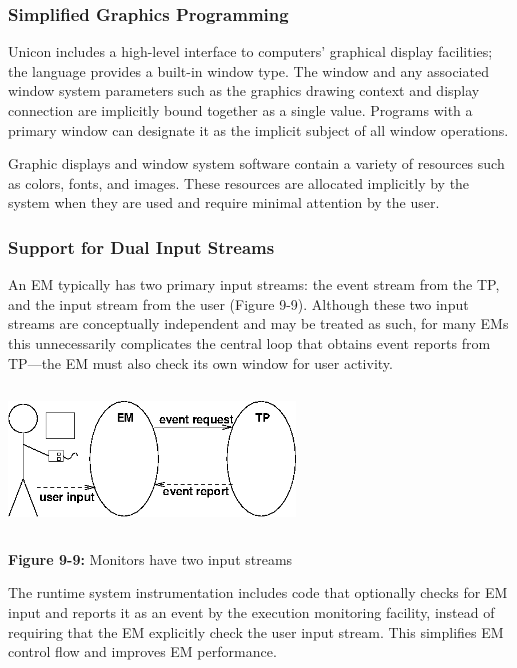 \subsubsection*{Simplified Graphics Programming}


Unicon includes a high-level interface to computers' graphical display
facilities; the language provides a built-in window
type.  The window and any associated window system parameters such as the
graphics drawing context and display connection are implicitly bound
together as a single value.  Programs with a primary window can
designate it as the implicit subject of all window operations.

Graphic displays and window system software contain a variety of
resources such as colors, fonts, and images.  These resources are
allocated implicitly by the system when they are used and require
minimal attention by the user.

\subsubsection{Support for Dual Input Streams}

An EM typically has two primary input streams: the event stream from
the TP, and the input stream from the user (Figure 9-9).  Although
these two input streams are conceptually independent and may be
treated as such, for many EMs this unnecessarily complicates
the central loop that obtains event reports from TP---the EM must
also check its own window for user activity.

\begin{center}
\includegraphics[width=3.0in,height=1.5in]{eventstr.png}
\end{center}

{\sffamily\bfseries Figure 9-9:}
{\sffamily Monitors have two input streams}

\bigskip


The runtime system instrumentation includes code that optionally
checks for EM input and reports it as an event by the execution
monitoring facility, instead of requiring that the EM explicitly check
the user input stream.  This simplifies EM control 
flow and improves EM performance.


